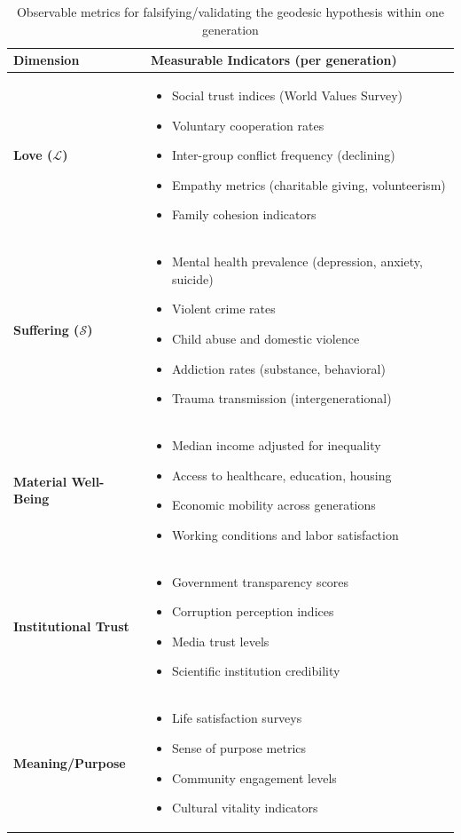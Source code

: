\documentclass[11pt,a4paper]{article}
\theoremstyle{definition}
\theoremstyle{remark}
\begin{document}
\begin{small}
\begin{table}[h]
\centering
\small
\begin{tabular}{|l|p{8cm}|}
\hline
\textbf{Dimension} & \textbf{Measurable Indicators (per generation)} \\
\hline
\textbf{Love ($\mathcal{L}$)} & 
\begin{itemize}[nosep,leftmargin=*]
\item Social trust indices (World Values Survey)
\item Voluntary cooperation rates
\item Inter-group conflict frequency (declining)
\item Empathy metrics (charitable giving, volunteerism)
\item Family cohesion indicators
\end{itemize} \\
\hline
\textbf{Suffering ($\mathcal{S}$)} & 
\begin{itemize}[nosep,leftmargin=*]
\item Mental health prevalence (depression, anxiety, suicide)
\item Violent crime rates
\item Child abuse and domestic violence
\item Addiction rates (substance, behavioral)
\item Trauma transmission (intergenerational)
\end{itemize} \\
\hline
\textbf{Material Well-Being} & 
\begin{itemize}[nosep,leftmargin=*]
\item Median income adjusted for inequality
\item Access to healthcare, education, housing
\item Economic mobility across generations
\item Working conditions and labor satisfaction
\end{itemize} \\
\hline
\textbf{Institutional Trust} & 
\begin{itemize}[nosep,leftmargin=*]
\item Government transparency scores
\item Corruption perception indices
\item Media trust levels
\item Scientific institution credibility
\end{itemize} \\
\hline
\textbf{Meaning/Purpose} & 
\begin{itemize}[nosep,leftmargin=*]
\item Life satisfaction surveys
\item Sense of purpose metrics
\item Community engagement levels
\item Cultural vitality indicators
\end{itemize} \\
\hline
\end{tabular}
\caption{Observable metrics for falsifying/validating the geodesic hypothesis within one generation}
\end{table}


\end{small}
\end{document}
